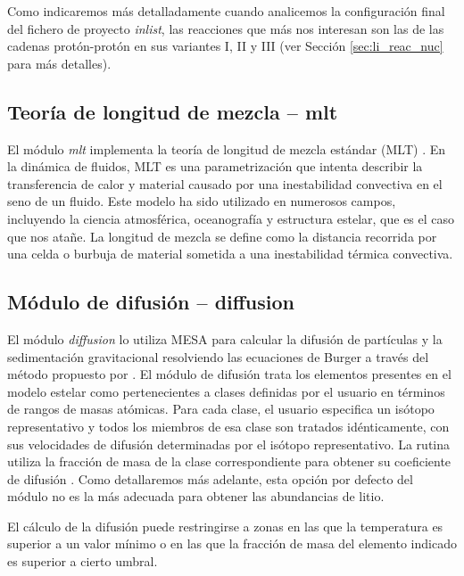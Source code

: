 Como indicaremos más detalladamente cuando analicemos la configuración final del fichero de proyecto \textit{inlist}, las reacciones que más nos interesan son las de las cadenas protón-protón en sus variantes I, II y III (ver Sección \ref{sec:li_reac_nuc} para más detalles).\par

\subsection{Teoría de longitud de mezcla – mlt}
El módulo \textit{mlt} implementa la teoría de longitud de mezcla estándar (MLT) \citep{Paxton2011}. En la dinámica de fluidos, MLT es una parametrización que intenta describir la transferencia de calor y material causado por una inestabilidad convectiva en el seno de un fluido. Este modelo ha sido utilizado en numerosos campos, incluyendo la ciencia atmosférica, oceanografía y estructura estelar, que es el caso que nos atañe. La longitud de mezcla se define como la distancia recorrida por una celda o burbuja de material sometida a una inestabilidad térmica convectiva.\par

\subsection{Módulo de difusión – diffusion} \label{subsec_diffusion}
El módulo \textit{diffusion} lo utiliza MESA para calcular la difusión de partículas y la sedimentación gravitacional resolviendo las ecuaciones de Burger \citep{Burgers1969} a través del método propuesto por \cite{Thoul1993}. El módulo de difusión trata los elementos presentes en el modelo estelar como pertenecientes a clases definidas por el usuario en términos de rangos de masas atómicas. Para cada clase, el usuario especifica un isótopo representativo y todos los miembros de esa clase son tratados idénticamente, con sus velocidades de difusión determinadas por el isótopo representativo. La rutina utiliza la fracción de masa de la clase correspondiente para obtener su coeficiente de difusión \citep{Paxton2015}. Como detallaremos más adelante, esta opción por defecto del módulo no es la más adecuada para obtener las abundancias de litio.\par

El cálculo de la difusión puede restringirse a zonas en las que la temperatura es superior a un valor mínimo o en las que la fracción de masa del elemento indicado es superior a cierto umbral.\par

